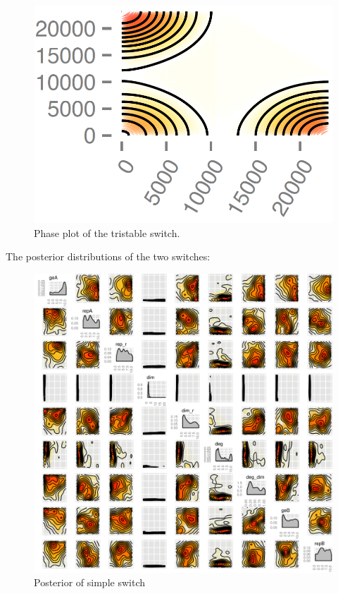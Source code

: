 \begin{figure}[h!]
\begin{center}
\includegraphics[scale=0.2]{chapterModelling/mass_action_switches/tri_stoch_images/phase_plot_tri.png}
\caption{Phase plot of the tristable switch.}\label{fig_1}
\end{center}
\end{figure}

The posterior distributions of the two switches:

\begin{figure}[htbp]
\begin{center}
\includegraphics[scale=0.15]{chapterModelling/mass_action_switches/bi_tri_same_priors/posterior_std_tri.png}
\caption{Posterior of simple switch}\label{fig_2}
\end{center}
\end{figure}

